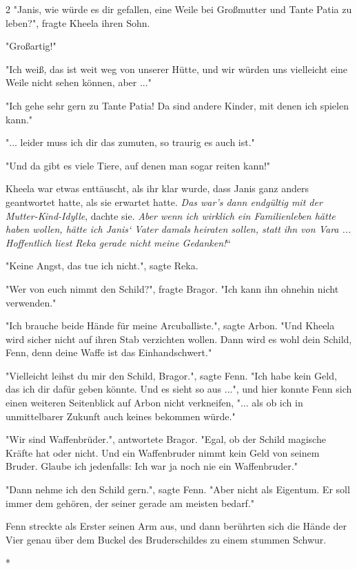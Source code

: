 \documentclass[10pt, a4paper, oneside]{book}
\begin{document}
\begin{multicols}{2}
"Janis, wie würde es dir gefallen, eine Weile bei Großmutter und Tante Patia zu leben?", fragte Kheela ihren Sohn. 

"Großartig!" 

"Ich weiß, das ist weit weg von unserer Hütte, und wir würden uns vielleicht eine Weile nicht sehen können, aber ..." 

"Ich gehe sehr gern zu Tante Patia! Da sind andere Kinder, mit denen ich spielen kann." 

"... leider muss ich dir das zumuten, so traurig es auch ist."

"Und da gibt es viele Tiere, auf denen man sogar reiten kann!"

Kheela war etwas enttäuscht, als ihr klar wurde, dass Janis ganz anders geantwortet hatte, als sie erwartet hatte. \textit{Das war’s dann endgültig mit der Mutter-Kind-Idylle}, dachte sie. \textit{Aber wenn ich wirklich ein Familienleben hätte haben wollen, hätte ich Janis‘ Vater damals heiraten sollen, statt ihn von Vara ... Hoffentlich liest Reka gerade nicht meine Gedanken!}“ 

"Keine Angst, das tue ich nicht.", sagte Reka. 

"Wer von euch nimmt den Schild?", fragte Bragor. "Ich kann ihn ohnehin nicht verwenden." 

"Ich brauche beide Hände für meine Arcuballiste.", sagte Arbon. "Und Kheela wird sicher nicht auf ihren Stab verzichten wollen. Dann wird es wohl dein Schild, Fenn, denn deine Waffe ist das Einhandschwert." 

"Vielleicht leihst du mir den Schild, Bragor.", sagte Fenn. "Ich habe kein Geld, das ich dir dafür geben könnte. Und es sieht so aus ...", und hier konnte Fenn sich einen weiteren Seitenblick auf Arbon nicht verkneifen, "... als ob ich in unmittelbarer Zukunft auch keines bekommen würde." 

"Wir sind Waffenbrüder.", antwortete Bragor. "Egal, ob der Schild magische Kräfte hat oder nicht. Und ein Waffenbruder nimmt kein Geld von seinem Bruder. Glaube ich jedenfalls: Ich war ja noch nie ein Waffenbruder." 

"Dann nehme ich den Schild gern.", sagte Fenn. "Aber nicht als Eigentum. Er soll immer dem gehören, der seiner gerade am meisten bedarf." 

Fenn streckte als Erster seinen Arm aus, und dann berührten sich die Hände der Vier genau über dem Buckel des Bruderschildes zu einem stummen Schwur. 

\begin{center}
    * 
\end{center}


\end{multicols}
\end{document}

